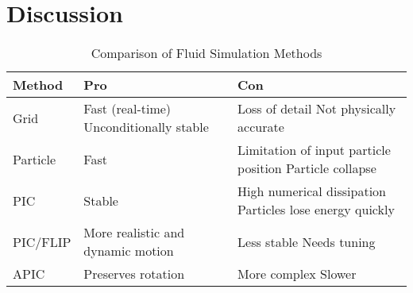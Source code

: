 \section{Discussion}
\begin{table}[!htbp]
\centering
\caption{Comparison of Fluid Simulation Methods}
\label{tab:fluid_comparison}
\begin{tabularx}{\columnwidth}{l X X}
\toprule
\textbf{Method} & \textbf{Pro} & \textbf{Con} \\
\midrule
Grid&
Fast (real-time) \newline
Unconditionally stable &
Loss of detail \newline
Not physically accurate \\
\midrule
Particle&
Fast &
Limitation of input particle position \newline
Particle collapse \\
\midrule
PIC&
Stable &
High numerical dissipation \newline
Particles lose energy quickly \\
\midrule
PIC/FLIP &
More realistic and dynamic motion &
Less stable \newline
Needs tuning \\
\midrule
APIC &
Preserves rotation &
More complex \newline
Slower \\
\bottomrule
\end{tabularx}
\end{table}